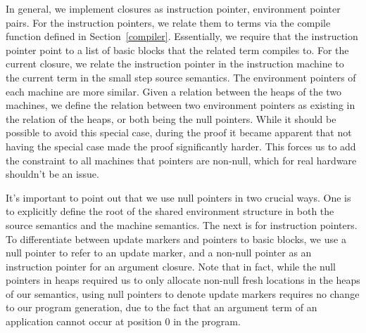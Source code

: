 In general, we implement closures as instruction pointer, environment pointer
pairs. For the instruction pointers, we relate them to terms via the compile
function defined in Section~\ref{compiler}. Essentially, we require that the
instruction pointer point to a list of basic blocks that the related term
compiles to. For the current closure, we relate the instruction pointer in the
instruction machine to the current term in the small step source semantics. The
environment pointers of each machine are more similar. Given a relation between
the heaps of the two machines, we define the relation between two environment
pointers as existing in the relation of the heaps, or both being the null
pointers. While it should be possible to avoid this special case, during the
proof it became apparent that not having the special case made the proof
significantly harder. This forces us to add the constraint to all machines that
pointers are non-null, which for real hardware shouldn't be an issue.  

It's important to point out that we use null pointers in two crucial ways. One
is to explicitly define the root of the shared environment structure in both the
source semantics and the machine semantics. The next is for instruction
pointers. To differentiate between update markers and pointers to basic blocks,
we use a null pointer to refer to an update marker, and a non-null pointer as an
instruction pointer for an argument closure. Note that in fact, while the null
pointers in heaps required us to only allocate non-null fresh locations in the
heaps of our semantics, using null pointers to denote update markers requires no
change to our program generation, due to the fact that an argument term of an
application cannot occur at position 0 in the program.

